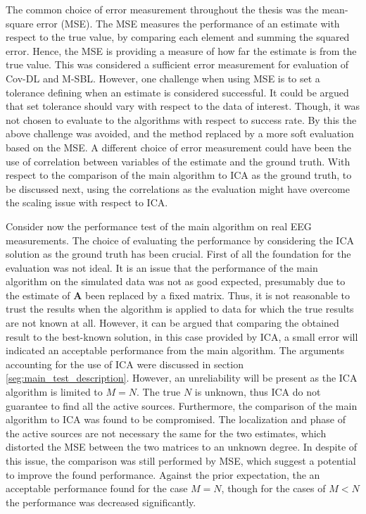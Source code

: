 The common choice of error measurement throughout the thesis was the mean-square error (MSE). 
The MSE measures the performance of an estimate with respect to the true value, by comparing each element and summing the squared error. 
Hence, the MSE is providing a measure of how far the estimate is from the true value. 
This was considered a sufficient error measurement for evaluation of Cov-DL and M-SBL.
However, one challenge when using MSE is to set a tolerance defining when an estimate is considered successful. 
It could be argued that set tolerance should vary with respect to the data of interest.
Though, it was not chosen to evaluate to the algorithms with respect to success rate. By this the above challenge was avoided, and the method replaced by a more soft evaluation based on the MSE. 
A different choice of error measurement could have been the use of correlation between variables of the estimate and the ground truth. With respect to the comparison of the main algorithm to ICA as the ground truth, to be discussed next, using the correlations as the evaluation might have overcome the scaling issue with respect to ICA.    

Consider now the performance test of the main algorithm on real EEG measurements. 
The choice of evaluating the performance by considering the ICA solution as the ground truth has been crucial. 
First of all the foundation for the evaluation was not ideal. 
It is an issue that the performance of the main algorithm on the simulated data was not as good expected, presumably due to the estimate of $\mathbf{A}$ been replaced by a fixed matrix. 
Thus, it is not reasonable to trust the results when the algorithm is applied to data for which the true results are not known at all. 
However, it can be argued that comparing the obtained result to the best-known solution, in this case provided by ICA, a small error will indicated an acceptable performance from the main algorithm. 
The arguments accounting for the use of ICA were discussed in section \ref{seg:main_test_description}. 
However, an unreliability will be present as the ICA algorithm is limited to $M = N$. 
The true $N$ is unknown, thus ICA do not guarantee to find all the active sources.
Furthermore, the comparison of the main algorithm to ICA was found to be compromised. 
The localization and phase of the active sources are not necessary the same for the two estimates, which distorted the MSE between the two matrices to an unknown degree.
In despite of this issue, the comparison was still performed by MSE, which suggest a potential to improve the found performance. 
Against the prior expectation, the an acceptable performance found for the case $M = N$, though for the cases of $M < N$ the performance was decreased significantly.    

